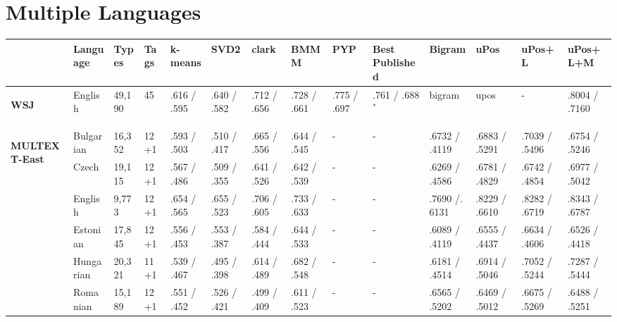 \section{Multiple Languages}
\begin{landscape}
\begin{table}[ht]
  \tiny
  \begin{tabular}{|l|l|l|l|p{1.5cm}|p{1.5cm}|p{1.5cm}|p{1.5cm}|p{1.5cm}|p{2cm}|p{2cm}|p{2cm}|p{2cm}|p{2cm}|}
        \hline
        & Language   & Types   & Tags & k-means      & SVD2         & clark        & BMMM         & PYP             & Best Published            & Bigram &uPos           & uPos+L            & uPos+L+M     \\ \hline %
        \multirow{1}{*}{\begin{sideways}\textbf{WSJ}\end{sideways}} 
        & English    & 49,190  & 45   & .616 / .595   & .640 / .582   & .712 / .656   & .728 / .661   & .775 / .697 & .761 / .688$^*$  &bigram &upos & - & .8004 / .7160           \\
        & & & & & & & & & & & & &\\ \hline
        \multirow{8}{*}{\begin{sideways}\textbf{MULTEXT-East}\end{sideways}} & 
        Bulgarian    & 16,352  & 12+1 & .593 / .503   & .510 / .417   & .665 / .556   & .644 / .545   & -           & - & .6732 / .4119 & .6883 / .5291 & .7039 / .5496     & .6754 / .5246 \\
        & Czech      & 19,115  & 12+1 & .567 / .486   & .509 / .355   & .641 / .526   & .642 / .539   & -           & - & .6269 / .4586 & .6781 / .4829 & .6742 / .4854     & .6977 / .5042 \\
        & English    & 9,773   & 12+1 & .654 / .565   & .655 / .523   & .706 / .605   & .733 / .633   & -           & - & .7690 /. 6131 & .8229 / .6610 & .8282 / .6719     & .8343 / .6787 \\
        & Estonian   & 17,845  & 12+1 & .556 / .453   & .553 / .387   & .584 / .444   & .644 / .533   & -           & - & .6089 / .4119 & .6555 / .4437 & .6634 / .4606     & .6526 / .4418 \\
        & Hungarian  & 20,321  & 11+1 & .539 / .467   & .495 / .398   & .614 / .489   & .682 / .548   & -           & - & .6181 / .4514 & .6914 / .5046 & .7052 / .5244     & .7287 / .5444 \\
        & Romanian   & 15,189  & 12+1 & .551 / .452   & .526 / .421   & .499 / .409   & .611 / .523   & -           & - & .6565 / .5202 & .6469 / .5012 & .6675 / .5269     & .6488 / .5251 \\

\end{tabular}
\end{table}
\end{landscape}
